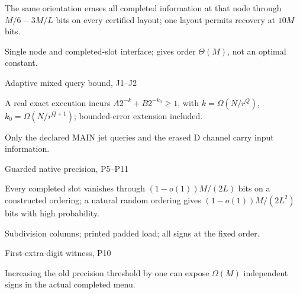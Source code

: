 \documentclass[11pt,a4paper]{article}
\newlength{\OfflineResearchTableWidth}
\newcommand{\OfflineResearchRow}{\par}
\newenvironment{OfflineResearchTable}{%
  \par\medskip\begingroup\small\setlength{\parindent}{0pt}%
  \setlength{\parskip}{3pt plus 1pt minus .5pt}%
  \setlength{\OfflineResearchTableWidth}{\linewidth}%
}{%
  \par\endgroup\medskip%
}
\begin{document}
\begin{OfflineResearchTable}
\begin{minipage}[t]{0.31500\OfflineResearchTableWidth}
The same orientation erases all completed
information at that node through \(M/6-3M/L\) bits on every certified
layout; one layout permits recovery at \(10M\) bits.
\end{minipage}\hfill%
\begin{minipage}[t]{0.31500\OfflineResearchTableWidth}\raggedright
Single node and
completed-slot interface; gives order \(\Theta(M)\), not an optimal
constant.
\end{minipage}%
\OfflineResearchRow
\noindent%
\begin{minipage}[t]{0.31500\OfflineResearchTableWidth}\raggedright
Adaptive mixed query bound, J1--J2
\end{minipage}\hfill%
\begin{minipage}[t]{0.31500\OfflineResearchTableWidth}\raggedright
A real exact execution incurs
\(A2^{-k}+B2^{-k_0}\ge1\), with \(k=\Omega(N/r^Q)\),
\(k_0=\Omega(N/r^{Q+1})\); bounded-error extension included.
\end{minipage}\hfill%
\begin{minipage}[t]{0.31500\OfflineResearchTableWidth}\raggedright
Only the
declared MAIN jet queries and the erased D channel carry input
information.
\end{minipage}%
\OfflineResearchRow
\noindent%
\begin{minipage}[t]{0.31500\OfflineResearchTableWidth}\raggedright
Guarded native precision, P5--P11
\end{minipage}\hfill%
\begin{minipage}[t]{0.31500\OfflineResearchTableWidth}\raggedright
Every completed slot vanishes
through \((1-o(1))M/(2L)\) bits on a constructed ordering; a natural
random ordering gives \((1-o(1))M/(2L^2)\) bits with high probability.
\end{minipage}\hfill%
\begin{minipage}[t]{0.31500\OfflineResearchTableWidth}\raggedright
Subdivision columns; printed padded load; all signs at the fixed
order.
\end{minipage}%
\OfflineResearchRow
\noindent%
\begin{minipage}[t]{0.31500\OfflineResearchTableWidth}\raggedright
First-extra-digit witness, P10
\end{minipage}\hfill%
\begin{minipage}[t]{0.31500\OfflineResearchTableWidth}\raggedright
Increasing the old precision threshold
by one can expose \(\Omega(M)\) independent signs in the actual
completed menu.
\end{minipage}\hfill%

\end{OfflineResearchTable}
\end{document}
